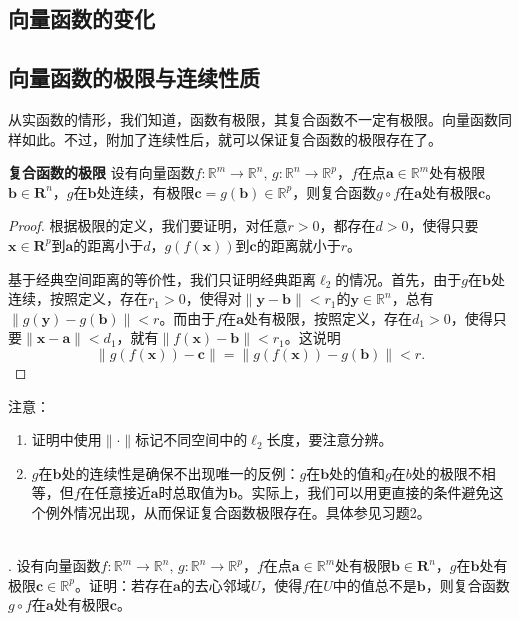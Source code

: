 \documentclass[12pt,UTF8,fontset=none]{ctexbook}
\begin{document}
\begin{appendix}

\chapter{向量函数的变化}

\section{向量函数的极限与连续性质}

从实函数的情形，我们知道，函数有极限，其复合函数不一定有极限。向量函数同样如此。不过，附加了连续性后，就可以保证复合函数的极限存在了。
\begin{tm}{\textbf{复合函数的极限}}
    设有向量函数$f:\mathbb{R}^m \rightarrow \mathbb{R}^n, \, g: \mathbb{R}^n \rightarrow \mathbb{R}^p$，$f$在点$\mathbf{a}\in\mathbb{R}^m$处有极限$\mathbf{b}\in\mathbf{R}^n$，$g$在$\mathbf{b}$处连续，有极限$\mathbf{c} = g(\mathbf{b})\in \mathbb{R}^p$，则复合函数$g\circ f$在$\mathbf{a}$处有极限$\mathbf{c}$。
\end{tm}
\begin{proof}
    根据极限的定义，我们要证明，对任意$r>0$，都存在$d>0$，使得只要$\mathbf{x}\in\mathbf{R}^p$到$\mathbf{a}$的距离小于$d$，$g(f(\mathbf{x}))$到$\mathbf{c}$的距离就小于$r$。

    基于经典空间距离的等价性，我们只证明经典距离$\ell_2$的情况。首先，由于$g$在$\mathbf{b}$处连续，按照定义，存在$r_1>0$，使得对$\|\mathbf{y} - \mathbf{b}\| < r_1$的$\mathbf{y}\in\mathbb{R}^n$，总有$\|g(\mathbf{y}) - g(\mathbf{b}) \| < r$。而由于$f$在$\mathbf{a}$处有极限，按照定义，存在$d_1 > 0$，使得只要$\|\mathbf{x} - \mathbf{a}\| < d_1$，就有$\| f(\mathbf{x}) - \mathbf{b}\| < r_1$。这说明
    $$\| g(f(\mathbf{x})) - \mathbf{c}\| = \| g(f(\mathbf{x})) - g(\mathbf{b})\| < r.$$
\end{proof}

注意：
\begin{enumerate}[label=\arabic*.]
    \item 证明中使用$\|\cdot\|$标记不同空间中的$\ell_2$长度，要注意分辨。
    \item $g$在$\mathbf{b}$处的连续性是确保不出现唯一的反例：$g$在$\mathbf{b}$处的值和$g$在$b$处的极限不相等，但$f$在任意接近$\mathbf{a}$时总取值为$\mathbf{b}$。实际上，我们可以用更直接的条件避免这个例外情况出现，从而保证复合函数极限存在。具体参见习题2。
\end{enumerate}

\begin{xt}
    \mbox{} \\
    . 设有向量函数$f:\mathbb{R}^m \rightarrow \mathbb{R}^n, \, g: \mathbb{R}^n \rightarrow \mathbb{R}^p$，$f$在点$\mathbf{a}\in\mathbb{R}^m$处有极限$\mathbf{b}\in\mathbf{R}^n$，$g$在$\mathbf{b}$处有极限$\mathbf{c}\in \mathbb{R}^p$。证明：若存在$\mathbf{a}$的去心邻域$U$，使得$f$在$U$中的值总不是$\mathbf{b}$，则复合函数$g\circ f$在$\mathbf{a}$处有极限$\mathbf{c}$。
\end{xt}


\end{appendix}
\end{document}
